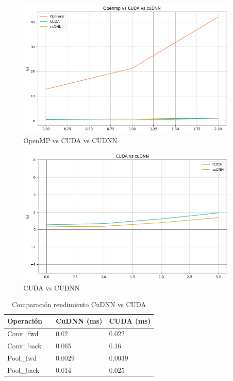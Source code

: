 \begin{figure}[H]
	\centering
	\includegraphics[scale=0.5]{imagenes/openmp_cuda_cudnn.png}  
	\caption{OpenMP vs CUDA vs CUDNN}
	\label{fig:openmp_cuda_cudnn}
\end{figure}

\begin{figure}[H]
	\centering
	\includegraphics[scale=0.5]{imagenes/cuda_cudnn_1.png}  
	\caption{CUDA vs CUDNN}
	\label{fig:cuda_cudnn_1}
\end{figure}

\begin{table}[H]
	\centering
	\begin{tabular}{llll}
		Operación 	 &\vline  & CuDNN (ms) & CUDA (ms)  \\
		\hline
		
		Conv\_fwd    & \vline & 0.02	 &	0.022 \\			
		Conv\_back   & \vline & 0.065	 &	0.16 \\
		\hline
		Pool\_fwd 	 & \vline & 0.0029	 &	0.0039 \\
		Pool\_back 	 & \vline & 0.014    &	0.025 \\

		
	\end{tabular}
	\caption{Comparación rendimiento CuDNN vs CUDA}
\end{table}
